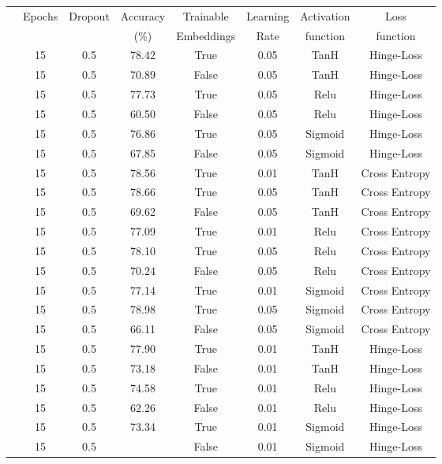 \documentclass[a0,landscape]{a0poster}
\begin{document}
\begin{multicols}{3}
\begin{tabular}{c | c |c | c | c | c | c | c }
	& Epochs & Dropout & Accuracy & Trainable & Learning & Activation & Loss \\
	& & &  (\%) & Embeddings & Rate & function & function\\
	\hline
	\hline
	{\multirow{15}{*}{\centering \rotatebox[origin=c]{90}{Lexical}}} & 15 & 0.5 & 78.42 & True & 0.05 & TanH & Hinge-Loss\\
	& 15 & 0.5 & 70.89 & False & 0.05 & TanH & Hinge-Loss\\
	& 15 & 0.5 & 77.73 & True & 0.05 & Relu & Hinge-Loss\\
	& 15 & 0.5 & 60.50 & False & 0.05 & Relu & Hinge-Loss\\
	& 15 & 0.5 & 76.86 & True & 0.05 & Sigmoid & Hinge-Loss\\
	& 15 & 0.5 & 67.85 & False & 0.05 & Sigmoid & Hinge-Loss\\
	& 15 & 0.5 & 78.56 & True & 0.01 & TanH & Cross Entropy\\
	& 15 & 0.5 & 78.66 & True & 0.05 & TanH & Cross Entropy\\
	& 15 & 0.5 & 69.62 & False & 0.05 & TanH & Cross Entropy\\
	& 15 & 0.5 & 77.09 & True & 0.01 & Relu & Cross Entropy\\
	& 15 & 0.5 & 78.10 & True & 0.05 & Relu & Cross Entropy\\
	& 15 & 0.5 & 70.24 & False & 0.05 & Relu & Cross Entropy\\
	& 15 & 0.5 & 77.14 & True & 0.01 & Sigmoid & Cross Entropy\\
	& 15 & 0.5 & 78.98 & True & 0.05 & Sigmoid & Cross Entropy\\
	& 15 & 0.5 & 66.11 & False & 0.05 & Sigmoid & Cross Entropy\\
		
	\hline
	\hline
	{\multirow{6}{*}{\rotatebox[origin=c]{90}{Acolex}}} & 15 & 0.5 & 77.90 & True & 0.01 & TanH & Hinge-Loss\\
	& 15 & 0.5 & 73.18 & False & 0.01 & TanH & Hinge-Loss\\
	& 15 & 0.5 & 74.58 & True & 0.01 & Relu & Hinge-Loss\\
	& 15 & 0.5 & 62.26 & False & 0.01 & Relu & Hinge-Loss\\
	& 15 & 0.5 & 73.34 & True & 0.01 & Sigmoid & Hinge-Loss\\
	& 15 & 0.5 &  & False & 0.01 & Sigmoid & Hinge-Loss\\

\end{tabular}


\end{multicols}
\end{document}
